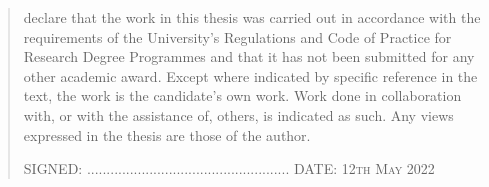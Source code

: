 \documentclass{mimosis-class/mimosis}
\numberwithin{equation}{chapter}
\begin{document}
\label{sec:orge1ccd07}
\begin{singlespace}
\begin{quote}
 declare that the work in this thesis was carried out in accordance with the requirements of  the University's Regulations and Code of Practice for Research Degree Programmes and that it  has not been submitted for any other academic award. Except where indicated by specific  reference in the text, the work is the candidate's own work. Work done in collaboration with, or with the assistance of, others, is indicated as such. Any views expressed in the thesis are those of the author.

\vspace{1.5cm}
\noindent
\hspace{-0.75cm}\textsc{SIGNED: .................................................... DATE: 12th  May 2022}
\end{quote}
\end{singlespace}
\end{document}
